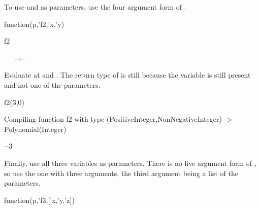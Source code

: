 \begin{xtc}
\begin{xtccomment}
To use  and  as parameters, use the
four argument form of .
\end{xtccomment}
\begin{spadsrc}
function(p,'f2,'x,'y) 
\end{spadsrc}
\begin{TeXOutput}
\begin{fricasmath}{8}
%
\end{fricasmath}
\end{TeXOutput}
\end{xtc}
\begin{xtc}
\begin{xtccomment}
\end{xtccomment}
\begin{spadsrc}
f2 
\end{spadsrc}
\begin{TeXOutput}
\begin{fricasmath}{9}
\ \ \SYMBOL{==}\ -{}+-{}%
\end{fricasmath}
\end{TeXOutput}
\end{xtc}
\begin{xtc}
\begin{xtccomment}
Evaluate  at  and .
The return type of  is still
 because the variable 
is still present and not one of the parameters.
\end{xtccomment}
\begin{spadsrc}
f2(3,0) 
\end{spadsrc}
\begin{MessageOutput}
   Compiling function f2 with type (PositiveInteger,NonNegativeInteger)
       -> Polynomial(Integer) 
\end{MessageOutput}
\begin{TeXOutput}
\begin{fricasmath}{10}
-{}-{3}%
\end{fricasmath}
\end{TeXOutput}
\end{xtc}
\begin{xtc}
\begin{xtccomment}
Finally, use all three variables as parameters.
There is no five argument form of , so use the one with
three arguments, the third argument being a list of the parameters.
\end{xtccomment}
\begin{spadsrc}
function(p,'f3,['x,'y,'z]) 
\end{spadsrc}
\begin{TeXOutput}
\begin{fricasmath}{11}
%
\end{fricasmath}
\end{TeXOutput}
\end{xtc}
